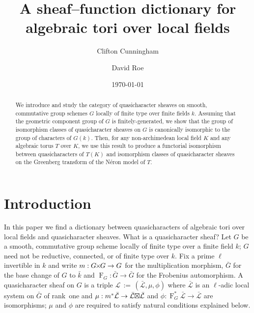 \documentclass[11pt]{amsart}
\title[Sheaf--function dictionary for local tori]{A sheaf--function dictionary for algebraic tori over local fields}
\date{\today}
\author{Clifton Cunningham}
\author{David Roe}
\theoremstyle{plain}
\theoremstyle{definition}
\theoremstyle{remark}
\newcommand{\bFq}{\bar{k}}
\newcommand{\Fq}{k}
\newcommand{\Frob}[1]{\operatorname{F}_{#1}}
\newcommand{\ceq}{{\, :=\, }}
\newcommand{\qcs}[1]{{\mathcal{#1}}}
\newcommand{\gqcs}[1]{{\mathcal{\bar #1}}}
\newcommand{\bG}{\bar{G}}
\newcommand{\tight}[3]{\hspace{-#1pt}{#2}\hspace{-#3pt}}
\newcommand{\GxG}{\text{$G \tight{1}{\times}{1} G$}}
\newcommand{\LxL}{\text{$\gqcs{L} \tight{0}{\boxtimes}{0} \gqcs{L}$}}
\begin{document}
\begin{abstract}
  We introduce and study the category of quasicharacter sheaves on smooth,
  commutative group schemes $G$ locally of finite type over finite fields
  $\Fq$. Assuming that the geometric component group of $G$
  is finitely-generated, we show that the group of isomorphism classes
  of quasicharacter sheaves on $G$ is canonically isomorphic to the group
  of characters of $G(\Fq)$. Then, for any non-archimedean local field $K$
  and any algebraic torus $T$ over $K$, we use this result to produce a functorial
  isomorphism between quasicharacters of $T(K)$ and isomorphism
  classes of quasicharacter sheaves on the Greenberg transform of the Néron
  model of $T$.
  \end{abstract}

\maketitle

\section*{Introduction}

%
In this paper we find a dictionary between quasicharacters of algebraic tori over local fields and quasicharacter sheaves. 
%
What is a quasicharacter sheaf?
Let $G$ be a smooth, commutative group scheme locally of finite
type over a finite field $\Fq$; $G$ need not be reductive, connected, or of
finite type over $\Fq$. Fix a prime $\ell$ invertible in $\Fq$
and write $m : \GxG \to G$ for the multiplication morphism,
$\bG$ for the base change of $G$ to $\bFq$ and
$\Frob{G} : \bG \to \bG$ for the Frobenius automorphism.
A quasicharacter sheaf on $G$ is a triple $\qcs{L}\ceq
(\gqcs{L},\mu,\phi)$ where $\gqcs{L}$ is an $\ell$-adic local system on $\bG$ of rank~one and $\mu: m^*
\gqcs{L} \to \LxL$ and $\phi : \Frob{G}^*\gqcs{L} \to \gqcs{L}$ are isomorphisms;
$\mu$ and $\phi$ are required to satisfy natural conditions explained below.
\end{document}
